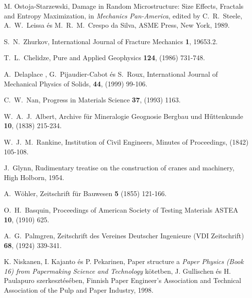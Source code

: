 \begin{thebibliography}{200}
\vspace*{-0.3cm}
 M. Ostoja-Starzewski, Damage in Random Microstructure: Size Effects, Fractals and Entropy Maximization, in {\it Mechanics Pan-America}, edited by C.\ R.\ Steele, A.\ W.\ Leissa \'es M.\ R.\ M.\ Crespo da Silva, ASME Press, New York, 1989.

\vspace*{-0.3cm}
 S.\ N.\ Zhurkov, International Journal of Fracture Mechanics {\bf 1}, 19653.2.

\vspace*{-0.3cm}
 T.\ L.\ Chelidze, Pure and Applied Geophysics {\bf 124}, (1986) 731-748.

\vspace*{-0.3cm}
 A.\ Delaplace , G.\ Pijaudier-Cabot \'es S.\ Roux, International Journal of Mechanical Physics of Solids, {\bf 44}, (1999) 99-106.

\vspace*{-0.3cm}
 C.\ W.\ Nan, Progress in Materials Science {\bf 37}, (1993) 1163.

\vspace*{-0.3cm}
 W.\ A.\ J.\ Albert, Archive f\"{u}r Mineralogie Geognosie Bergbau und H\H{u}ttenkunde {\bf 10}, (1838) 215-234.

\vspace*{-0.3cm}
 W.\ J.\ M.\ Rankine, Institution of Civil Engineers, Minutes of Proceedings, (1842) 105-108.

\vspace*{-0.3cm}
 J.\ Glynn, Rudimentary treatise on the construction of cranes and machinery, High Holborn, 1954.

\vspace*{-0.3cm}
 A.\ Wöhler, Zeitschrift f\"{u}r Bauwesen {\bf 5} (1855) 121-166.

\vspace*{-0.3cm}
 O.\ H.\ Basquin, Proceedings of American Society of Testing Materials ASTEA {\bf 10}, (1910) 625.

\vspace*{-0.3cm}
 A.\ G.\ Palmgren, Zeitschrift des Vereines Deutscher Ingenieure (VDI Zeitschrift) {\bf 68}, (1924) 339-341.

\vspace*{-0.3cm}
 K. Niskanen, I. Kajanto \'es P. Pekarinen, Paper structure a {\it Paper Physics (Book 16) from Papermaking Science and Technology} k\"{o}tetben, J. Gullischen \'es H. Paulapuro szerkeszt\'es\'eben, Finnish Paper Engineer's Association and Technical Association of the Pulp and Paper Industry, 1998.


\end{thebibliography}
